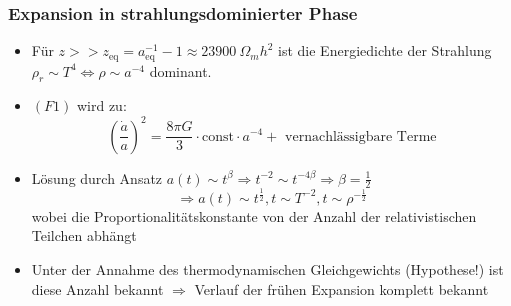 \subsubsection{Expansion in strahlungsdominierter Phase}
\begin{itemize}
	\item Für $z>>z_\text{eq}=a^{-1}_\text{eq}-1\approx\SI{23900}{\Omega_mh^2}$ ist die Energiedichte der Strahlung $\rho_r\sim T^4\Leftrightarrow \rho\sim a^{-4}$ dominant.
	\item $(F1)$ wird zu:
		\begin{equation*}
			\left(\frac{\dot{a}}{a}\right)^2=\frac{8\pi G}{3}\cdot\text{const}\cdot a^{-4} + \text{ vernachlässigbare Terme}
		\end{equation*}
	\item Lösung durch Ansatz $a(t)\sim t^\beta \Rightarrow t^{-2}\sim t^{-4\beta} \Rightarrow \beta=\frac{1}{2}$
		\begin{equation*}
			\Rightarrow a(t)\sim t^\frac{1}{2}, t\sim T^{-2}, t\sim\rho^{-\frac{1}{2}}
		\end{equation*}
		wobei die Proportionalitätskonstante von der Anzahl der relativistischen Teilchen abhängt
	\item Unter der Annahme des thermodynamischen Gleichgewichts (Hypothese!) ist diese Anzahl bekannt $\Rightarrow$ Verlauf der frühen Expansion komplett bekannt
\end{itemize}

